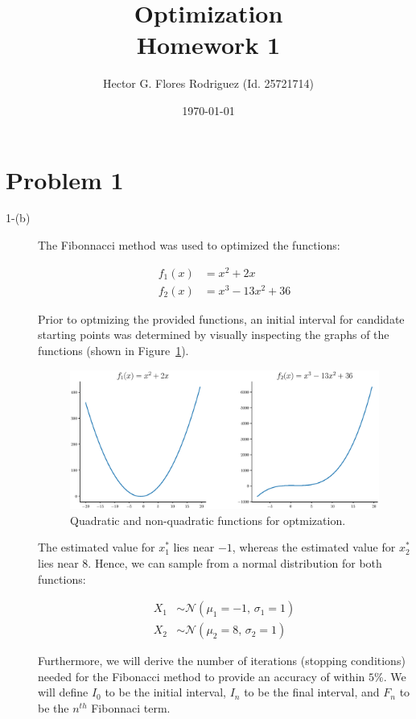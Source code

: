 \documentclass[11pt,onside]{article}
\title{\blue Optimization \\
\blueb Homework 1}
\author{Hector G. Flores Rodriguez (Id. 25721714)}
\date{\today} %
\begin{document}
\maketitle

\section{Problem 1}
\begin{description}
\item[1-(b)] The Fibonnacci method was used to optimized the functions:

\begin{align*}
f_{1}(x) &= x^2 + 2x \\
f_{2}(x) &= x^3 - 13x^2 + 36
\end{align*}

Prior to optmizing the provided functions, an initial interval for candidate starting points was determined by visually inspecting the graphs of the functions (shown in Figure~\ref{fig:functions}). 

\begin{figure}[h]
  \includegraphics[width=\linewidth]{figs/functions.eps}
  \caption{Quadratic and non-quadratic functions for optmization.}
  \label{fig:functions}
\end{figure}

The estimated value for $x_{1}^*$ lies near $-1$, whereas the estimated value for $x_{2}^*$ lies near $8$. Hence, we can sample from a normal distribution for both functions:

\begin{align*}
X_1 &\sim \mathcal{N}(\mu_{1} = -1,\,\sigma_{1} = 1) \\
X_2 &\sim \mathcal{N}(\mu_{2} = 8,\,\sigma_{2} = 1)
\end{align*}

Furthermore, we will derive the number of iterations (stopping conditions) needed for the Fibonacci method to provide an accuracy of within $5\%$. We will define $I_0$ to be the initial interval, $I_n$ to be the final interval, and $F_n$ to be the $n^{th}$ Fibonnaci term.


\end{description}
\end{document}
